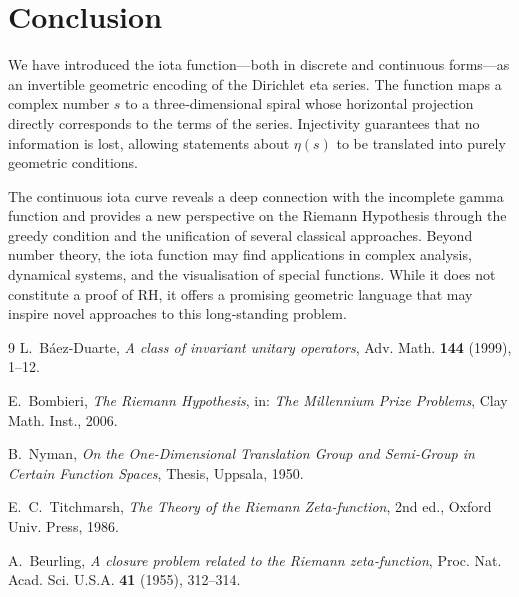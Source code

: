 \documentclass[11pt]{article}
\begin{document}
\section{Conclusion}

We have introduced the iota function—both in discrete and continuous forms—as an invertible geometric encoding of the Dirichlet eta series.  The function maps a complex number $s$ to a three‑dimensional spiral whose horizontal projection directly corresponds to the terms of the series.  Injectivity guarantees that no information is lost, allowing statements about $\eta(s)$ to be translated into purely geometric conditions.

The continuous iota curve reveals a deep connection with the incomplete gamma function and provides a new perspective on the Riemann Hypothesis through the greedy condition and the unification of several classical approaches.  Beyond number theory, the iota function may find applications in complex analysis, dynamical systems, and the visualisation of special functions.  While it does not constitute a proof of RH, it offers a promising geometric language that may inspire novel approaches to this long‑standing problem.

\begin{thebibliography}{9}
L.~B\'aez-Duarte, \emph{A class of invariant unitary operators}, Adv. Math. \textbf{144} (1999), 1--12.

E.~Bombieri, \emph{The Riemann Hypothesis}, in: \emph{The Millennium Prize Problems}, Clay Math. Inst., 2006.

B.~Nyman, \emph{On the One‑Dimensional Translation Group and Semi‑Group in Certain Function Spaces}, Thesis, Uppsala, 1950.

E.~C.~Titchmarsh, \emph{The Theory of the Riemann Zeta‑function}, 2nd ed., Oxford Univ. Press, 1986.

A.~Beurling, \emph{A closure problem related to the Riemann zeta‑function}, Proc. Nat. Acad. Sci. U.S.A. \textbf{41} (1955), 312--314.

\end{thebibliography}
\end{document}
